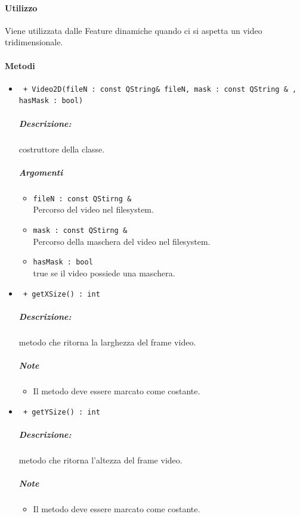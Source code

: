 \paragraph{Utilizzo \\}
Viene utilizzata dalle Feature\g{} dinamiche quando ci si aspetta un video tridimensionale.

\paragraph{Metodi\\}
	\begin{itemize}
		\item \color{blue}\verb! + Video2D(fileN : const QString& fileN, mask : const QString & , hasMask : bool)!\\
			\color{black}
			\subparagraph{Descrizione:} costruttore della classe.
			\subparagraph{Argomenti}
				\begin{itemize}
					\item \color{RoyalPurple}\verb!fileN : const QStirng &!\\
					\color{black}Percorso del video nel filesystem.
					\item \color{RoyalPurple}\verb!mask : const QStirng &!\\
					\color{black}Percorso della maschera del video nel filesystem.
					\item \color{RoyalPurple}\verb!hasMask : bool!\\
					\color{black} true se il video possiede una maschera.
				\end{itemize}
				
		\item \color{blue}\verb! + getXSize() : int !\\
		\color{black}
		\subparagraph{Descrizione:} metodo che ritorna la larghezza del frame video.
		\subparagraph{Note}
			\begin{itemize}
				\item Il metodo deve essere marcato come costante.
			\end{itemize}
		
		\item \color{blue}\verb! + getYSize() : int !\\
		\color{black}
		\subparagraph{Descrizione:} metodo che ritorna l'altezza del frame video.
		\subparagraph{Note}
			\begin{itemize}
				\item Il metodo deve essere marcato come costante.
			\end{itemize}
		

\end{itemize}
